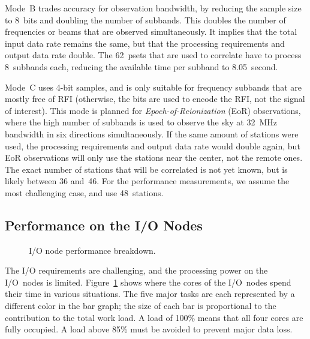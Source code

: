 \documentclass{sig-alternate}
\begin{document}
Mode~\textsf{B} trades accuracy for observation bandwidth, by reducing the
sample size to 8~bits and doubling the number of subbands.
This doubles the number of frequencies or beams that are observed
simultaneously.
It implies that the total input data rate remains the same, but that the
processing requirements and output data rate double.
The 62~psets that are used to correlate have to process 8~subbands each,
reducing the available time per subband to 8.05~second.

Mode~\textsf{C} uses 4-bit samples, and is only suitable for frequency
subbands that are mostly free of RFI (otherwise, the bits are used to encode
the RFI, not the signal of interest).
This mode is planned for \emph{Epoch-of-Reionization} (EoR) observations, where the
high number of subbands is used to observe the sky at 32~MHz bandwidth in six
directions simultaneously.
If the same amount of stations were used, the processing requirements and
output data rate would double again, but EoR observations will only use the
stations near the center, not the remote ones.
The exact number of stations that will be correlated is not yet known, but is
likely between 36 and~46.
For the performance measurements, we assume the most challenging
case, and use 48~stations.


\subsection{Performance on the I/O Nodes}
\label{sec:ION-performance}

\begin{figure}[ht]
\hfill
{}
\caption{I/O node performance breakdown.}
\label{fig:ion-performance}
\end{figure}

The I/O requirements are challenging, and the processing power on the I/O~nodes
is limited.
Figure~\ref{fig:ion-performance} shows where the cores of the
I/O~nodes spend their time in various situations.
The five major tasks are each represented by a different color in the bar
graph; the size of each bar is proportional to the contribution to the total
work load.
A load of 100\% means that all four cores are fully occupied.
A load above 85\% must be avoided to prevent major data loss.
\end{document}
